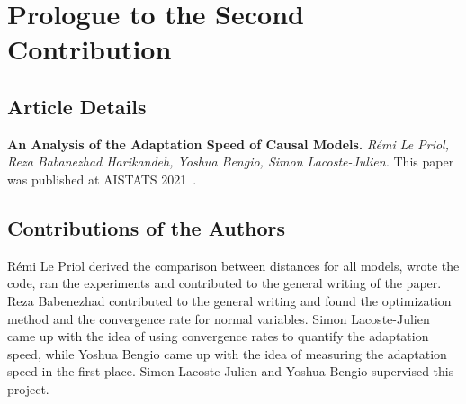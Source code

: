 \setcounter{theorem}{0}


\newcommand*{\entropy}{\mathcal{H}}
\newcommand*{\softargmax}{p \circ}

\newcommand*{\ptrue}{\ensuremath{\bm{p}}}
\newcommand*{\causalvar}{\theta_\rightarrow}
\newcommand*{\antivar}{\theta_\leftarrow}
\newcommand*{\pmodel}{\ensuremath{\bm{p}_{\causalvar}}}
\newcommand*{\panti}{\ensuremath{\bm{p}_{\antivar}}}

\newcommand*{\ptransfer}{\ptrue^*} 
\newcommand*{\natgauss}{\cN_\text{nat}}
\newcommand*{\chogauss}{\cN_\text{cho}}
\newcommand*{\Dir}{\mathrm{Dir}}
\newcommand*{\uniform}{\vu}
\newcommand*{\lr}{\gamma}

\newcommand{\mm}{m}
\newcommand{\logpartition}{A}
\newcommand{\alpin}{\alpha}
\newcommand{\nn}{n}
\newcommand{\logpartitionb}{B}
\newcommand{\betin}{\beta}
\newcommand{\red}[1]{{\color{red}#1}}

\newcommand*{\smoothness}{B}
\newcommand*{\strongconvexity}{\mu}
\newcommand*{\gradientvariance}{\sigma^2}



\chapter{Prologue to the Second Contribution}

\section{Article Details}

\textbf{An Analysis of the Adaptation Speed of Causal Models.} 
\emph{R\'emi Le Priol, Reza Babanezhad Harikandeh, Yoshua Bengio, Simon Lacoste-Julien.} 
This paper was published at AISTATS 2021~\citep{lepriol2021analysis}.

\section{Contributions of the Authors}
Rémi Le Priol derived the comparison between distances for all models, wrote the code, ran the experiments and contributed to the general writing of the paper.
Reza Babenezhad contributed to the general writing and found the optimization method and the convergence rate for normal variables.
Simon Lacoste-Julien came up with the idea of using convergence rates to quantify the adaptation speed, while Yoshua Bengio came up with the idea of measuring the adaptation speed in the first place. 
Simon Lacoste-Julien and Yoshua Bengio supervised this project. 

